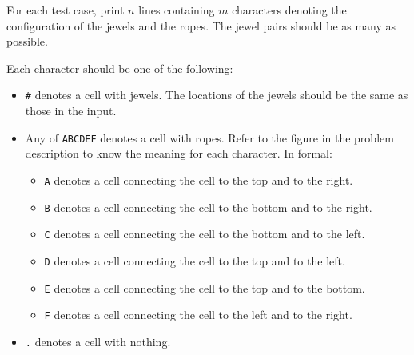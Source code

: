 For each test case, print $n$ lines containing $m$ characters denoting the configuration of the jewels and the ropes.
The jewel pairs should be as many as possible.

Each character should be one of the following:
\begin{itemize}
\item \texttt{\#} denotes a cell with jewels. The locations of the jewels should be the same as those in the input.
\item Any of \texttt{ABCDEF} denotes a cell with ropes. Refer to the figure in the problem description to know the meaning for each character. In formal:
\begin{itemize}
    \item \texttt{A} denotes a cell connecting the cell to the top and to the right.
    \item \texttt{B} denotes a cell connecting the cell to the bottom and to the right.
    \item \texttt{C} denotes a cell connecting the cell to the bottom and to the left.
    \item \texttt{D} denotes a cell connecting the cell to the top and to the left.
    \item \texttt{E} denotes a cell connecting the cell to the top and to the bottom.
    \item \texttt{F} denotes a cell connecting the cell to the left and to the right.
\end{itemize}
\item \texttt{.} denotes a cell with nothing.
\end{itemize}